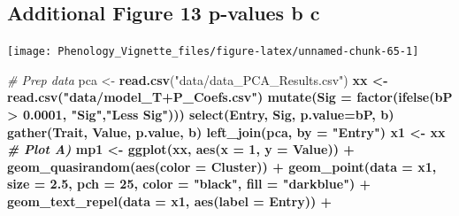 \documentclass[
]{article}
\newenvironment{Shaded}{\begin{snugshade}}{\end{snugshade}}
\newcommand{\CommentTok}[1]{\textcolor[rgb]{0.56,0.35,0.01}{\textit{#1}}}
\newcommand{\DataTypeTok}[1]{\textcolor[rgb]{0.13,0.29,0.53}{#1}}
\newcommand{\DecValTok}[1]{\textcolor[rgb]{0.00,0.00,0.81}{#1}}
\newcommand{\FloatTok}[1]{\textcolor[rgb]{0.00,0.00,0.81}{#1}}
\newcommand{\KeywordTok}[1]{\textcolor[rgb]{0.13,0.29,0.53}{\textbf{#1}}}
\newcommand{\NormalTok}[1]{#1}
\newcommand{\OperatorTok}[1]{\textcolor[rgb]{0.81,0.36,0.00}{\textbf{#1}}}
\newcommand{\StringTok}[1]{\textcolor[rgb]{0.31,0.60,0.02}{#1}}
\begin{document}
\hypertarget{additional-figure-13-p-values-b-c}{%
\subsection{Additional Figure 13 p-values b
c}\label{additional-figure-13-p-values-b-c}}

\texttt{[image: Phenology\_Vignette\_files/figure-latex/unnamed-chunk-65-1]}

\begin{Shaded}
\begin{Highlighting}[]
\CommentTok{# Prep data}
\NormalTok{pca <-}\StringTok{ }\KeywordTok{read.csv}\NormalTok{(}\StringTok{"data/data_PCA_Results.csv"}\NormalTok{) }\OperatorTok{%
\NormalTok{xx <-}\StringTok{ }\KeywordTok{read.csv}\NormalTok{(}\StringTok{"data/model_T+P_Coefs.csv"}\NormalTok{) }\OperatorTok{%
\StringTok{  }\KeywordTok{mutate}\NormalTok{(}\DataTypeTok{Sig =} \KeywordTok{factor}\NormalTok{(}\KeywordTok{ifelse}\NormalTok{(bP }\OperatorTok{>}\StringTok{ }\FloatTok{0.0001}\NormalTok{, }\StringTok{"Sig"}\NormalTok{,}\StringTok{"Less Sig"}\NormalTok{))) }\OperatorTok{%
\StringTok{  }\KeywordTok{select}\NormalTok{(Entry, Sig, }\DataTypeTok{p.value=}\NormalTok{bP, b) }\OperatorTok{%
\StringTok{  }\KeywordTok{gather}\NormalTok{(Trait, Value, p.value, b) }\OperatorTok{%
\StringTok{  }\KeywordTok{left_join}\NormalTok{(pca, }\DataTypeTok{by =} \StringTok{"Entry"}\NormalTok{)}
\NormalTok{x1 <-}\StringTok{ }\NormalTok{xx }\OperatorTok{%
\CommentTok{# Plot A)}
\NormalTok{mp1 <-}\StringTok{ }\KeywordTok{ggplot}\NormalTok{(xx, }\KeywordTok{aes}\NormalTok{(}\DataTypeTok{x =} \DecValTok{1}\NormalTok{, }\DataTypeTok{y =}\NormalTok{ Value)) }\OperatorTok{+}
\StringTok{  }\KeywordTok{geom_quasirandom}\NormalTok{(}\KeywordTok{aes}\NormalTok{(}\DataTypeTok{color =}\NormalTok{ Cluster)) }\OperatorTok{+}
\StringTok{    }\KeywordTok{geom_point}\NormalTok{(}\DataTypeTok{data =}\NormalTok{ x1, }\DataTypeTok{size =} \FloatTok{2.5}\NormalTok{, }\DataTypeTok{pch =} \DecValTok{25}\NormalTok{, }\DataTypeTok{color =} \StringTok{"black"}\NormalTok{, }\DataTypeTok{fill =} \StringTok{"darkblue"}\NormalTok{) }\OperatorTok{+}
\StringTok{  }\KeywordTok{geom_text_repel}\NormalTok{(}\DataTypeTok{data =}\NormalTok{ x1, }\KeywordTok{aes}\NormalTok{(}\DataTypeTok{label =}\NormalTok{ Entry)) }\OperatorTok{+}
}}}}}}
\end{Highlighting}
\end{Shaded}
\end{document}
